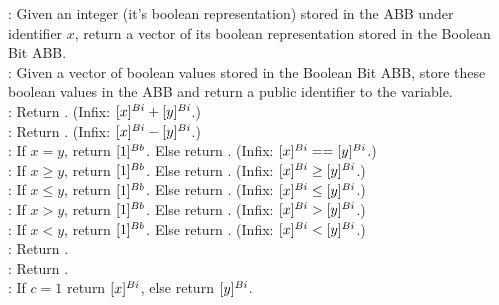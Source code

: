 \begin{functionality}
	: Given an integer (it's boolean representation) stored in 
	the ABB under identifier $x$, return a vector of its boolean representation stored
	in the Boolean Bit ABB. \\

	: Given a vector of boolean values stored in the Boolean Bit ABB, store 
	these boolean values in the ABB and return a public identifier to the variable. \\
	
	: Return . (Infix: $[x]^{Bi} + [y]^{Bi}$.)\\
	
	: Return . (Infix: $[x]^{Bi} - [y]^{Bi}$.)\\
	
	: If $x = y$, return $[1]^{Bb}$. 
	Else return . (Infix: $[x]^{Bi} == [y]^{Bi}$.)\\
	
	: If $x \ge y$, return $[1]^{Bb}$. 
	Else return . (Infix: $[x]^{Bi} \ge [y]^{Bi}$.)\\
	
	: If $x \le y$, return $[1]^{Bb}$. 
	Else return . (Infix: $[x]^{Bi} \le [y]^{Bi}$.)\\
	
	: If $x > y$, return $[1]^{Bb}$. 
	Else return . (Infix: $[x]^{Bi} > [y]^{Bi}$.)\\
	
	: If $x < y$, return $[1]^{Bb}$. 
	Else return . (Infix: $[x]^{Bi} < [y]^{Bi}$.)\\
	
	: Return . \\
	
	: Return . \\
	
	: If $c=1$ return $[x]^{Bi}$, else return $[y]^{Bi}$.
	
\end{functionality}
